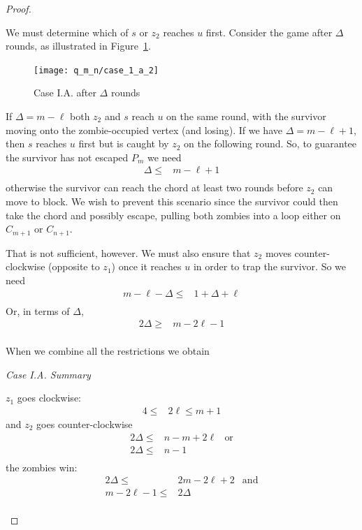 \begin{proof}
\begin{proofpart}
  We must determine which of $s$ or $z_2$ reaches $u$ first. Consider the game after $\Delta$ rounds, as illustrated in Figure~\ref{fig:case_1_a_2}.

  \begin{figure}
    \centering
    \texttt{[image: q\_m\_n/case\_1\_a\_2]}
    \caption{Case I.A. after $\Delta$ rounds \label{fig:case_1_a_2}}
  \end{figure}

  If $\Delta = m - \ell$ both $z_2$ and $s$ reach $u$ on the same round,
  with the survivor moving onto the zombie-occupied vertex (and losing).
  If we have $\Delta = m - \ell + 1$, then $s$ reaches $u$ first
  but is caught by $z_2$ on the following round.
  So, to guarantee the survivor has not escaped $P_m$ we need
  \begin{align*}
   \Delta \leq & m- \ell + 1 \\
  \end{align*}
  otherwise the survivor can reach the chord at least two rounds
  before $z_2$ can move to block. We wish to prevent this scenario since
  the survivor could then take the chord and possibly escape, pulling
  both zombies into a loop either on $C_{m+1}$ or $C_{n+1}$.

  That is not sufficient, however. We must also ensure that $z_2$ moves
  counter-clockwise (opposite to $z_1$) once it reaches $u$ in order to trap the
  survivor. So we need
  \begin{align*}
   m - \ell - \Delta \leq & 1 + \Delta + \ell \\
\end{align*}
Or, in terms of $\Delta$,
\begin{align*}
   2 \Delta \geq          & m - 2\ell  -1     \\
  \end{align*}

  When we combine all the restrictions we obtain

  \textit{Case I.A. Summary}

  $z_1$ goes clockwise:
  \begin{align*}
   4 \leq & 2 \ell \leq m + 1
  \end{align*}
  and $z_2$ goes counter-clockwise
  \begin{align*}
   2 \Delta \leq & n - m + 2\ell & \text{or} \\
   2 \Delta \leq & n - 1                     \\
  \end{align*}
  the zombies win:
  \begin{align*}
   2 \Delta \leq      & 2 m- 2 \ell + 2 & \text{and} \\
   m - 2\ell  -1 \leq & 2 \Delta                     \\
  \end{align*}


\end{proofpart}
\end{proof}
